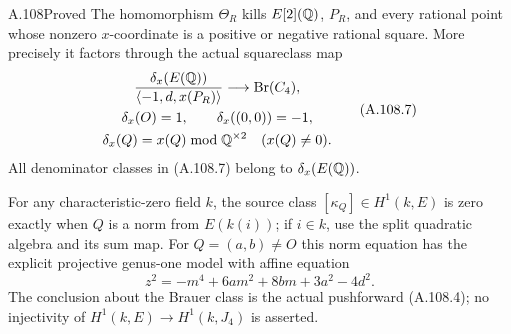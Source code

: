 \begin{statement}{A.108}{Proved}
The homomorphism $\Theta_R$ kills $E[2](\mathbb Q)$, $P_R$,
and every rational point whose nonzero $x$-coordinate
is a positive or negative rational square.
More precisely it factors through the actual squareclass map
\[
 \begin{gathered}
 \frac{\delta_x(E(\mathbb Q))}
       {\langle-1,d,x(P_R)\rangle}
 \longrightarrow \operatorname{Br}(C_4),\\
 \delta_x(O)=1,\qquad
 \delta_x((0,0))=-1,\\
 \delta_x(Q)=x(Q)\bmod\mathbb Q^{\times2}
                         \quad(x(Q)\ne0).
 \end{gathered}
\tag{A.108.7}
\]
All denominator classes in (A.108.7) belong to
$\delta_x(E(\mathbb Q))$.

For any characteristic-zero field $k$, the source class
$[\kappa_Q]\in H^1(k,E)$ is zero exactly when
$Q$ is a norm from $E(k(i))$; if $i\in k$, use the split
quadratic algebra and its sum map.
For $Q=(a,b)\ne O$ this norm equation has the explicit
projective genus-one model with affine equation
\[
 z^2=-m^4+6am^2+8bm+3a^2-4d^2.
\tag{A.108.8}
\]
The conclusion about the Brauer class is the actual
pushforward (A.108.4); no injectivity of
$H^1(k,E)\to H^1(k,J_4)$ is asserted.
\end{statement}
